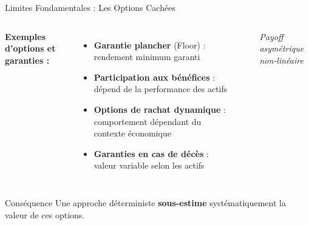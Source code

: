 \documentclass[10pt,aspectratio=169,xcolor={dvipsnames}]{beamer}
\begin{document}
\begin{frame}{Limites Fondamentales : Les Options Cachées}
\begin{columns}
\textbf{Exemples d'options et garanties :}
\begin{itemize}
    \item \textbf{Garantie plancher} (Floor) : rendement minimum garanti
    \item \textbf{Participation aux bénéfices} : dépend de la performance des actifs
    \item \textbf{Options de rachat dynamique} : comportement dépendant du contexte économique
    \item \textbf{Garanties en cas de décès} : valeur variable selon les actifs
\end{itemize}

\begin{center}
\end{center}
\textit{Payoff asymétrique non-linéaire}
\end{columns}

\vspace{0.3cm}
\begin{exampleblock}{Conséquence}
Une approche déterministe \textbf{sous-estime} systématiquement la valeur de ces options.
\end{exampleblock}
\end{frame}
\end{document}
